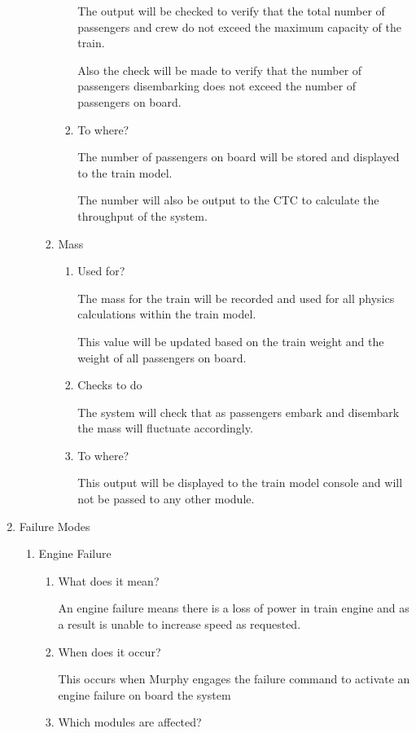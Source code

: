 \documentclass[11pt]{article}
\begin{document}
\begin{enumerate}
\begin{enumerate}
\begin{enumerate}
\begin{enumerate}
The output will be checked to verify that the total number of passengers and crew do not exceed the maximum capacity of the train.

Also the check will be made to verify that the number of passengers disembarking does not exceed the number of passengers on board.
\item To where?
\label{sec-3-1-4-2-2-4-3}

The number of passengers on board will be stored and displayed to the train model.

The number will also be output to the CTC to calculate the throughput of the system.
\end{enumerate}
\item Mass
\label{sec-3-1-4-2-2-5}
\begin{enumerate}
\item Used for?
\label{sec-3-1-4-2-2-5-1}

The mass for the train will be recorded and used for all physics calculations within the train model.

This value will be updated based on the train weight and the weight of all passengers on board.
\item Checks to do
\label{sec-3-1-4-2-2-5-2}

The system will check that as passengers embark and disembark the mass will fluctuate accordingly. 
\item To where?
\label{sec-3-1-4-2-2-5-3}

This output will be displayed to the train model console and will not be passed to any other module.
\end{enumerate}
\end{enumerate}
\end{enumerate}
\item Failure Modes
\label{sec-3-1-4-3}

\begin{enumerate}
\item Engine Failure
\label{sec-3-1-4-3-1}
\begin{enumerate}
\item What does it mean?
\label{sec-3-1-4-3-1-1}

An engine failure means there is a loss of power in train engine and as a result is unable to increase speed as requested.
\item When does it occur?
\label{sec-3-1-4-3-1-2}

This occurs when Murphy engages the failure command to activate an engine failure on board the system
\item Which modules are affected?
\label{sec-3-1-4-3-1-3}


\end{enumerate}
\end{enumerate}
\end{enumerate}
\end{document}
